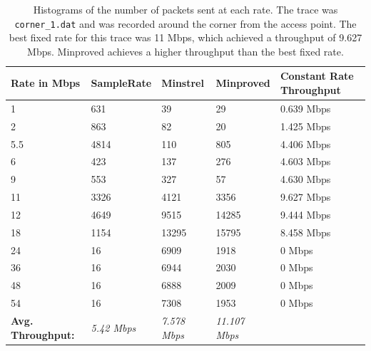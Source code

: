 \documentclass[twocolumn,10pt]{article}
\begin{document}
\begin{table}[htb]
    \centering
    \begin{tabular}{l|l|l|l|l}

    \textbf{Rate in Mbps} & \textbf{SampleRate} &
    \textbf{Minstrel} & \textbf{Minproved} &
    \textbf{Constant Rate Throughput}\\ \hline

    1   & 631  & 39    & 29    & 0.639 Mbps \\
    2   & 863  & 82    & 20    & 1.425 Mbps \\
    5.5 & 4814 & 110   & 805   & 4.406 Mbps \\
    6   & 423  & 137   & 276   & 4.603 Mbps \\
    9   & 553  & 327   & 57    & 4.630 Mbps \\
    11  & 3326 & 4121  & 3356  & 9.627 Mbps \\
    12  & 4649 & 9515  & 14285 & 9.444 Mbps \\
    18  & 1154 & 13295 & 15795 & 8.458 Mbps \\
    24  & 16   & 6909  & 1918  & 0 Mbps \\
    36  & 16   & 6944  & 2030  & 0 Mbps \\
    48  & 16   & 6888  & 2009  & 0 Mbps \\
    54  & 16   & 7308  & 1953  & 0 Mbps \\ \hline

    \textbf{Avg. Throughput:} & \emph{5.42 Mbps}  & \emph{7.578 Mbps} & \emph{11.107 Mbps} \\
    \end{tabular}
    \caption{Histograms of the number of packets sent at each rate.
      The trace was \texttt{corner\_1.dat} and was recorded around the
      corner from the access point.  The best fixed rate for this
      trace was 11 Mbps, which achieved a throughput of 9.627 Mbps.
      Minproved achieves a higher throughput than the best fixed
      rate.}

    \label{table:2}
\end{table}
\end{document}
